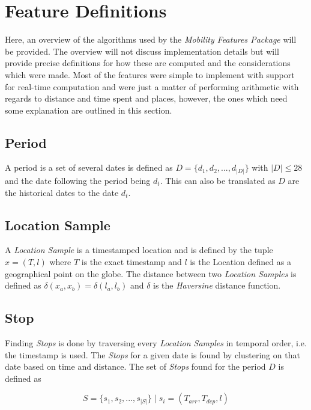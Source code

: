 \section{Feature Definitions}
\label{section:definitions}
Here, an overview of the algorithms used by the \textit{Mobility Features Package} will be provided. The overview will not discuss implementation details but will provide precise definitions for how these are computed and the considerations which were made. Most of the features were simple to implement with support for real-time computation and were just a matter of performing arithmetic with regards to distance and time spent and places, however, the ones which need some explanation are outlined in this section. 

\subsection{Period}
A period is a set of several dates is defined as $D = \{d_1, d_2, ..., d_{|D|}\}$ with $|D| \leq 28$ and the date following the period being $d_t$. This can also be translated as $D$ are the historical dates to the date $d_t$.\\

\subsection{Location Sample}
A \textit{Location Sample} is a timestamped location and is defined by the tuple $x = (T, l)$ where $T$ is the exact timestamp and $l$ is the Location defined as a geographical point on the globe. The distance between two \textit{Location Samples} is defined as $\delta(x_a, x_b) = \delta(l_a, l_b)$ and $\delta$ is the \textit{Haversine} distance function.

\subsection{Stop}
Finding \textit{Stops} is done by traversing every \textit{Location Samples} in temporal order, i.e. the timestamp is used. The \textit{Stops} for a given date is found by clustering  on that date based on time and distance. The set of \textit{Stops} found for the period $D$ is defined as

\begin{equation}
\label{eq:feature-stops}
S = \{s_1, s_2, ..., s_{|S|}\} \;| \; s_i = (T_{arr}, T_{dep}, l)
\end{equation}

